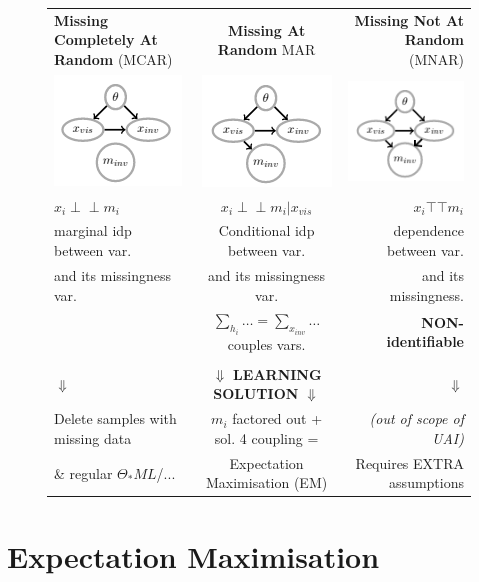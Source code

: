 \documentclass[a4paper,10pt]{article}
\newcommand{\negspace}{\!\!\!}
\newcommand{\idp}{\perp \negspace \perp}
\newcommand{\dep}{\top \negspace \top}
\begin{document}
\begin{figure}[htb!]
\begin{tabular}{l||c||r}
\textbf{Missing Completely At Random} (MCAR) & \textbf{Missing At Random} MAR & \textbf{Missing Not At Random} (MNAR) \\
\includegraphics{gMCAR.png} & \includegraphics{gMAR.png} & \includegraphics{gMNAR.png}  \\
$x_i \idp m_i$ & $x_i \idp m_i | x_{vis}$ & $x_i \dep m_i$ \\ 
marginal idp between var. & Conditional idp between var. &  dependence between var. \\
and its missingness var. & and its missingness var.   &  and its missingness. \\ 
& $\sum_{h_i} \ldots = \sum_{x_{inv}} \ldots $ couples vars. & \textbf{NON-identifiable} \\ \hline \\ 
 $\Downarrow$ & $\Downarrow$ \textbf{LEARNING SOLUTION} $\Downarrow$ &  $\Downarrow$ \\
Delete samples with missing data & $m_i$ factored out + sol. 4 coupling = & \textit{(out of scope of UAI)} \\  
\& regular $\Theta_*ML$/... &  Expectation Maximisation (EM) & Requires EXTRA assumptions \\ 
\end{tabular}
\centering
\end{figure}

\section{Expectation Maximisation}
\end{document}
